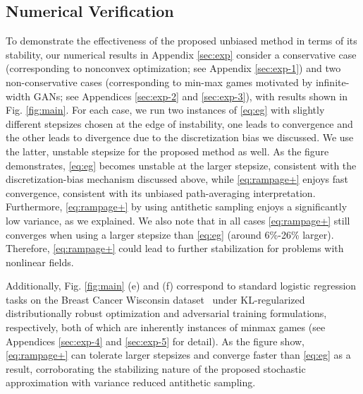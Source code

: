 \documentclass[letter,11pt]{article}
\begin{document}
\subsection{Numerical Verification}
To demonstrate the effectiveness of the proposed unbiased method in terms of its stability, our numerical results in Appendix \ref{sec:exp} consider a conservative case (corresponding to nonconvex optimization; see Appendix \ref{sec:exp-1}) and two non-conservative cases (corresponding to min-max games motivated by infinite-width GANs; see Appendices \ref{sec:exp-2} and \ref{sec:exp-3}), with results shown in Fig. \ref{fig:main}. For each case, we run two instances of \eqref{eq:eg} with slightly different stepsizes chosen at the edge of instability, one leads to convergence and the other leads to divergence due to the discretization bias we discussed. We use the latter, unstable stepsize for the proposed method as well. As the figure demonstrates, \eqref{eq:eg} becomes unstable at the larger stepsize, consistent with the discretization-bias mechanism discussed above, while \eqref{eq:rampage+} enjoys fast convergence, consistent with its unbiased path-averaging interpretation. Furthermore, \eqref{eq:rampage+} by using antithetic sampling enjoys a significantly low variance, as we explained. We also note that in all cases \eqref{eq:rampage+} still converges when using a larger stepsize than \eqref{eq:eg} (around 6\%-26\% larger). Therefore, \eqref{eq:rampage+} could lead to further stabilization for problems with nonlinear fields.

Additionally, Fig. \ref{fig:main} (e) and (f) correspond to standard logistic regression tasks on the Breast Cancer Wisconsin dataset~\cite{breast_cancer_wisconsin_diagnostic_17} under KL-regularized distributionally robust optimization and adversarial training formulations, respectively, both of which are inherently instances of minmax games (see Appendices \ref{sec:exp-4} and \ref{sec:exp-5} for detail). As the figure show, \eqref{eq:rampage+} can tolerate larger stepsizes and converge faster than \eqref{eq:eg} as a result, corroborating the stabilizing nature of the proposed stochastic approximation with variance reduced antithetic sampling.
\end{document}
